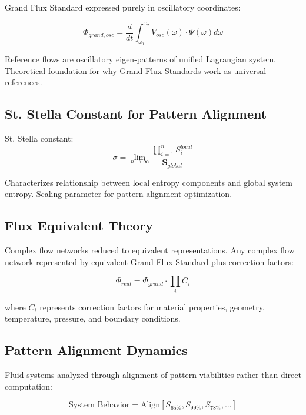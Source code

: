 \documentclass[12pt,a4paper]{article}
\begin{document}
Grand Flux Standard expressed purely in oscillatory coordinates:

\begin{equation}
\Phi_{grand,osc} = \frac{d}{dt}\int_{\omega_1}^{\omega_2} V_{osc}(\omega) \cdot \Psi(\omega) d\omega
\end{equation}

Reference flows are oscillatory eigen-patterns of unified Lagrangian system. Theoretical foundation for why Grand Flux Standards work as universal references.

\subsection{St. Stella Constant for Pattern Alignment}

St. Stella constant:
\begin{equation}
\sigma = \lim_{n \to \infty} \frac{\prod_{i=1}^{n} S_i^{local}}{\mathbf{S}_{global}}
\end{equation}

Characterizes relationship between local entropy components and global system entropy. Scaling parameter for pattern alignment optimization.

\subsection{Flux Equivalent Theory}

Complex flow networks reduced to equivalent representations. Any complex flow network represented by equivalent Grand Flux Standard plus correction factors:

\begin{equation}
\Phi_{real} = \Phi_{grand} \cdot \prod_{i} C_i
\end{equation}

where $C_i$ represents correction factors for material properties, geometry, temperature, pressure, and boundary conditions.

\subsection{Pattern Alignment Dynamics}

Fluid systems analyzed through alignment of pattern viabilities rather than direct computation:

\begin{equation}
\text{System Behavior} = \text{Align}[S_{65\%}, S_{99\%}, S_{78\%}, \ldots]
\end{equation}
\end{document}
